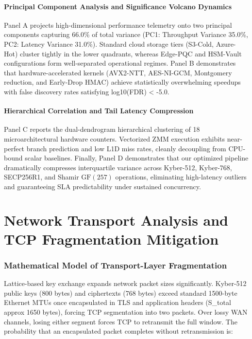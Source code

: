\documentclass[5p,times]{elsarticle}
\begin{document}
\paragraph{Principal Component Analysis and Significance Volcano Dynamics}

Panel A projects high-dimensional performance telemetry onto two principal components capturing 66.0\% of total variance (PC1: Throughput Variance 35.0\%, PC2: Latency Variance 31.0\%). Standard cloud storage tiers (S3-Cold, Azure-Hot) cluster tightly in the lower quadrants, whereas Edge-PQC and HSM-Vault configurations form well-separated operational regimes. Panel B demonstrates that hardware-accelerated kernels (AVX2-NTT, AES-NI-GCM, Montgomery reduction, and Early-Drop HMAC) achieve statistically overwhelming speedups with false discovery rates satisfying log10(FDR) < -5.0.


\paragraph{Hierarchical Correlation and Tail Latency Compression}

Panel C reports the dual-dendrogram hierarchical clustering of 18 microarchitectural hardware counters. Vectorized ZMM execution exhibits near-perfect branch prediction and low L1D miss rates, cleanly decoupling from CPU-bound scalar baselines. Finally, Panel D demonstrates that our optimized pipeline dramatically compresses interquartile variance across Kyber-512, Kyber-768, SECP256R1, and Shamir $\text{GF}(257)$ operations, eliminating high-latency outliers and guaranteeing SLA predictability under sustained concurrency.


\FloatBarrier
\section{Network Transport Analysis and TCP Fragmentation Mitigation}


\subsubsection{Mathematical Model of Transport-Layer Fragmentation}

Lattice-based key exchange expands network packet sizes significantly. Kyber-512 public keys (800 bytes) and ciphertexts (768 bytes) exceed standard 1500-byte Ethernet MTUs once encapsulated in TLS and application headers (S\_total approx 1650 bytes), forcing TCP segmentation into two packets. Over lossy WAN channels, losing either segment forces TCP to retransmit the full window. The probability that an encapsulated packet completes without retransmission is:
\end{document}
